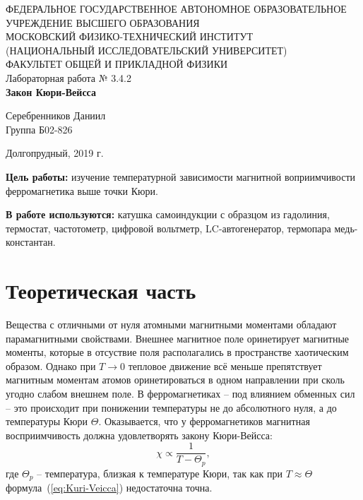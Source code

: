 \documentclass[a4paper,12pt]{article} %
\begin{document}
\begin{center}
	\footnotesize{ФЕДЕРАЛЬНОЕ ГОСУДАРСТВЕННОЕ АВТОНОМНОЕ ОБРАЗОВАТЕЛЬНОЕ 			УЧРЕЖДЕНИЕ ВЫСШЕГО ОБРАЗОВАНИЯ}\\
	\footnotesize{МОСКОВСКИЙ ФИЗИКО-ТЕХНИЧЕСКИЙ ИНСТИТУТ\\(НАЦИОНАЛЬНЫЙ 			ИССЛЕДОВАТЕЛЬСКИЙ УНИВЕРСИТЕТ)}\\
	\footnotesize{ФАКУЛЬТЕТ ОБЩЕЙ И ПРИКЛАДНОЙ ФИЗИКИ\\}
	\hfill \break
	\hfill\break
	\hfill\break
	\hfill \break
	\hfill \break
	\hfill \break
	\hfill \break
	\hfill \break
	\hfill \break
	\hfill \break
	\hfill \break
	\hfill \break
	\hfill \break
	\hfill \break
	\large{Лабораторная работа № 3.4.2\\\textbf{Закон Кюри-Вейсса}}\\
	\hfill \break
	\hfill \break
	\hfill \break
	\begin{flushright}
		Серебренников Даниил\\
		Группа Б02-826
	\end{flushright}
	\hfill \break
	\hfill \break
	\hfill \break
	\hfill \break
	\hfill \break
\end{center}
\hfill \break
\hfill \break
\hfill \break
\hfill \break
\hfill \break
\hfill \break
\begin{center}
	Долгопрудный, 2019 г.
\end{center}
\thispagestyle{empty}
\newpage

\textbf{Цель работы:} изучение температурной зависимости магнитной воприимчивости ферромагнетика выше точки Кюри.

\textbf{В работе используются:} катушка самоиндукции с образцом из гадолиния, термостат, частотометр, цифровой вольтметр, LC-автогенератор, термопара медь-константан.


\section{Теоретическая часть}
	Вещества с отличными от нуля атомными магнитными моментами обладают парамагнитными свойствами. Внешнее магнитное поле оринетирует магнитные моменты, которые в отсуствие поля располагались в пространстве хаотическим образом. Однако при $T \rightarrow 0$ тепловое движение всё меньше препятствует магнитным моментам атомов оринетироваться в одном направлении при сколь угодно слабом внешнем поле. В ферромагнетиках -- под влиянием обменных сил -- это происходит при понижении температуры не до абсолютного нуля, а до температуры Кюри $\Theta$. Оказывается, что у ферромагнетиков магнитная восприимчивость должна удовлетворять закону Кюри-Вейсса:
	\begin{equation}
		\label{eq:Kuri-Veicca}
		\chi \propto \frac{1}{T-\Theta_p},
	\end{equation}
	где $\Theta_p$ -- температура, близкая к температуре Кюри, так как при $T \approx \Theta$ формула~(\ref{eq:Kuri-Veicca}) недостаточна точна.
\end{document}
